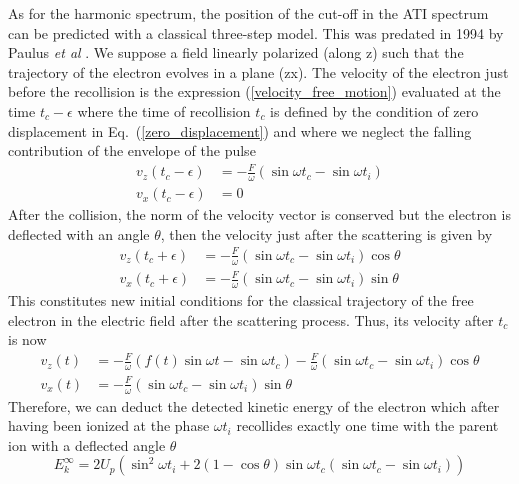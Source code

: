 \documentclass[a4paper]{article}
\begin{document}
As for the harmonic spectrum, the position of the cut-off in the ATI spectrum can be predicted with a classical three-step model. This was predated in 1994 by Paulus \textit{et al} \cite{Paulus_1994_Classical_Model}. We suppose a field linearly polarized (along z) such that the trajectory of the electron evolves in a plane (zx). The velocity of the electron just before the recollision is the expression (\ref{velocity_free_motion}) evaluated at the time $t_{c}-\epsilon$ where the time of recollision $t_{c}$ is defined by the condition of zero displacement in Eq.~(\ref{zero_displacement}) and where we neglect the falling contribution of the envelope of the pulse
\begin{align}
v_{z}(t_{c}-\epsilon)&=-\frac{F}{\omega} \left( \sin{\omega t_{c}} - \sin{\omega t_{i}} \right) \\
v_{x}(t_{c}-\epsilon)&=0
\end{align}
After the collision, the norm of the velocity vector is conserved but the electron is deflected with an angle $\theta$, then the velocity just after the scattering is given by
\begin{align}
v_{z}(t_{c}+\epsilon)&=-\frac{F}{\omega} \left( \sin{\omega t_{c}} - \sin{\omega t_{i}} \right) \cos{\theta} \\
v_{x}(t_{c}+\epsilon)&=-\frac{F}{\omega} \left( \sin{\omega t_{c}} - \sin{\omega t_{i}} \right) \sin{\theta}
\end{align}
This constitutes new initial conditions for the classical trajectory of the free electron in the electric field after the scattering process. Thus, its velocity after $t_{c}$ is now
\begin{align}
\label{vz_theta}
v_{z}(t)&=-\frac{F}{\omega} \left(f(t)\sin{\omega t}-\sin{\omega t_{c}} \right) - \frac{F}{\omega} \left( \sin{\omega t_{c}}-\sin{\omega t_{i}} \right) \cos{\theta} \\
\label{vx_theta}
v_{x}(t)&=-\frac{F}{\omega} \left( \sin{\omega t_{c}} - \sin{\omega t_{i}} \right) \sin{\theta}
\end{align}
Therefore, we can deduct the detected kinetic energy of the electron which after having been ionized at the phase $\omega t_{i}$ recollides exactly one time with the parent ion with a deflected angle $\theta$
\begin{equation}
E_{k}^{\infty}=2 U_{p} \left(\sin^{2}{\omega t_{i}}+2(1-\cos{\theta})\sin{\omega t_{c}} \left(\sin{\omega t_{c}}-\sin{\omega t_{i}}\right)\right)
\label{kinetic_energy_theta}
\end{equation}
\end{document}
